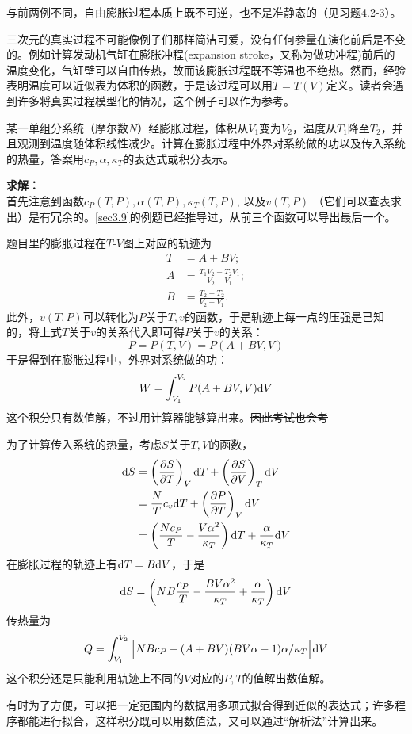 与前两例不同，自由膨胀过程本质上既不可逆，也不是准静态的（见习题4.2-3）。
\begin{example}
三次元的真实过程不可能像例子们那样简洁可爱，没有任何参量在演化前后是不变的。例如计算发动机气缸在膨胀冲程(expansion stroke，又称为做功冲程)前后的温度变化，气缸壁可以自由传热，故而该膨胀过程既不等温也不绝热。然而，经验表明温度可以近似表为体积的函数，于是该过程可以用$T = T(V)$定义。读者会遇到许多将真实过程模型化的情况，这个例子可以作为参考。

某一单组分系统（摩尔数$N$）经膨胀过程，体积从$V_1$变为$V_2$，温度从$T_1$降至$T_2$，并且观测到温度随体积线性减少。计算在膨胀过程中外界对系统做的功以及传入系统的热量，答案用$c_P, \alpha, \kappa_T$的表达式或积分表示。

{\bf 求解：}\\
首先注意到函数$c_P (T, P), \alpha(T, P), \kappa_T (T, P)$, 以及$v(T, P)$ （它们可以查表求出）是有冗余的。\ref{sec3.9}的例题已经推导过，从前三个函数可以导出最后一个。

题目里的膨胀过程在$T\text{-}V$图上对应的轨迹为
\begin{align*}
	T &= A + BV; \\
	A &= \frac{T_1 V_2 - T_2 V_1}{V_2 - V_1}; \\
	B &= \frac{T_2 - T_2}{V_2 - V_1}.
\end{align*}
此外，$v(T, P)$可以转化为$P$关于$T, v$的函数，于是轨迹上每一点的压强是已知的，将上式$T$关于$v$的关系代入即可得$P$关于$v$的关系： 
\[
	P = P(T, V) = P(A + BV, V)
\]
于是得到在膨胀过程中，外界对系统做的功：
\[
	W = \int_{V_1}^{V_2} P(A + BV, V) \mathrm{d} V 
\]
这个积分只有数值解，不过用计算器能够算出来。\sout{因此考试也会考} 

为了计算传入系统的热量，考虑$S$关于$T, V$的函数， 
\begin{align*}
	\mathrm{d} S &= \left( \frac{\partial S}{\partial T} \right)_V \mathrm{d} T + \left( \frac{\partial S}{\partial V} \right)_T \mathrm{d} V \\
	&= \frac{N}{T} c_v \mathrm{d} T + \left( \frac{\partial P}{\partial T} \right)_V \mathrm{d} V \\
	&= \left( \frac{Nc_P}{T} - \frac{V \alpha^2}{\kappa_T} \right) \mathrm{d} T + \frac{\alpha}{\kappa_T} \mathrm{d} V 
\end{align*}
在膨胀过程的轨迹上有$\mathrm{d} T = B \mathrm{d} V$，于是 
\[
	\mathrm{d} S = \left( NB\frac{c_P}{T} - \frac{BV\alpha^2}{\kappa_T} + \frac{\alpha}{\kappa_T} \right) \mathrm{d} V 
\]
传热量为
\[
	Q = \int_{V_1}^{V_2} \Big[ NBc_P - (A + BV)(BV\alpha - 1)\alpha / \kappa_T \Big] \mathrm{d} V 
\]
这个积分还是只能利用轨迹上不同的$V$对应的$P, T$的值解出数值解。

有时为了方便，可以把一定范围内的数据用多项式拟合得到近似的表达式；许多程序都能进行拟合，这样积分既可以用数值法，又可以通过“解析法”计算出来。
\end{example}

